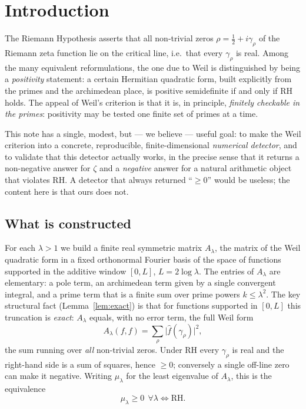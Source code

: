 \documentclass[11pt]{amsart}
\theoremstyle{definition}
\theoremstyle{remark}
\newcommand{\lam}{\lambda}
\begin{document}
\tableofcontents

\section{Introduction}\label{sec:intro}

The Riemann Hypothesis asserts that all non-trivial zeros $\rho=\tfrac12+i\gamma_\rho$ of the Riemann zeta function lie on the critical line, i.e.\ that every $\gamma_\rho$ is real. Among the many equivalent reformulations, the one due to Weil \cite{weil1952} is distinguished by being a \emph{positivity} statement: a certain Hermitian quadratic form, built explicitly from the primes and the archimedean place, is positive semidefinite if and only if RH holds. The appeal of Weil's criterion is that it is, in principle, \emph{finitely checkable in the primes}: positivity may be tested one finite set of primes at a time.

This note has a single, modest, but --- we believe --- useful goal: to make the Weil criterion into a concrete, reproducible, finite-dimensional \emph{numerical detector}, and to validate that this detector actually works, in the precise sense that it returns a non-negative answer for $\zeta$ and a \emph{negative} answer for a natural arithmetic object that violates RH. A detector that always returned ``$\ge 0$'' would be useless; the content here is that ours does not.

\subsection*{What is constructed}
For each $\lam>1$ we build a finite real symmetric matrix $A_\lam$, the matrix of the Weil quadratic form in a fixed orthonormal Fourier basis of the space of functions supported in the additive window $[0,L]$, $L=2\log\lam$. The entries of $A_\lam$ are elementary: a pole term, an archimedean term given by a single convergent integral, and a prime term that is a finite sum over prime powers $k\le\lam^2$. The key structural fact (Lemma~\ref{lem:exact}) is that for functions supported in $[0,L]$ this truncation is \emph{exact}: $A_\lam$ equals, with no error term, the full Weil form
\[
A_\lam(f,f)=\sum_{\rho}\bigl|\widehat f(\gamma_\rho)\bigr|^2,
\]
the sum running over \emph{all} non-trivial zeros. Under RH every $\gamma_\rho$ is real and the right-hand side is a sum of squares, hence $\ge 0$; conversely a single off-line zero can make it negative. Writing $\mu_\lam$ for the least eigenvalue of $A_\lam$, this is the equivalence
\[
\boxed{\;\mu_\lam\ge 0\ \ \forall\lam \iff \text{RH}.\;}
\]
\end{document}
